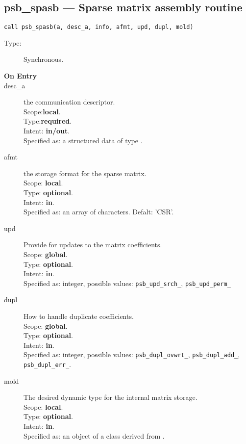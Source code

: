 %
%
\clearpage\subsection{psb\_spasb --- Sparse matrix assembly routine}

\begin{verbatim}
call psb_spasb(a, desc_a, info, afmt, upd, dupl, mold)
\end{verbatim}

\begin{description}
\item[Type:] Synchronous.
\item[\bf On Entry]
\item[desc\_a] the communication descriptor.\\
Scope:{\bf local}.\\
Type:{\bf required}.\\
Intent: {\bf in/out}.\\
Specified as: a structured data of type \descdata.
\item[afmt] the storage format for the sparse matrix.\\
Scope: {\bf local}.\\
Type: {\bf optional}.\\
Intent: {\bf in}.\\
Specified as: an array of characters. Defalt:  'CSR'.
\item[upd] Provide for updates to the matrix coefficients.\\
Scope: {\bf global}.\\
Type: {\bf optional}.\\
Intent: {\bf in}.\\
Specified as: integer, possible values: \verb|psb_upd_srch_|, \verb|psb_upd_perm_|
\item[dupl] How to handle duplicate coefficients.\\
Scope: {\bf global}.\\
Type: {\bf optional}.\\
Intent: {\bf in}.\\
Specified as: integer, possible values: \verb|psb_dupl_ovwrt_|,
\verb|psb_dupl_add_|, \verb|psb_dupl_err_|.
\item[mold] The desired dynamic type for the internal matrix storage.\\
Scope: {\bf local}.\\
Type: {\bf optional}.\\
Intent: {\bf in}.\\
Specified as: an object of a class derived from \spbasedata. 
\end{description}


